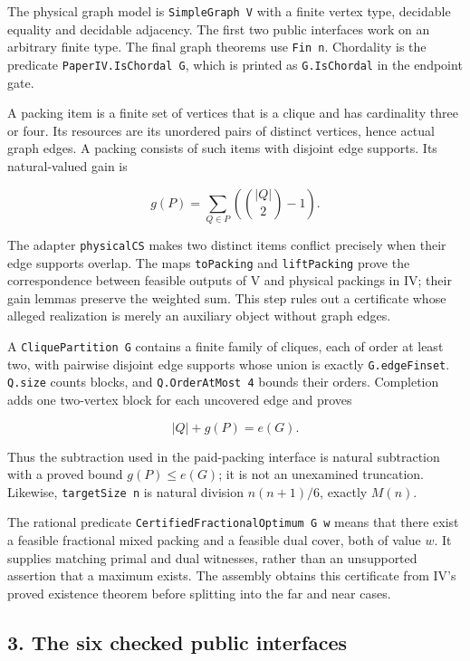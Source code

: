\documentclass[english,11pt,a4paper]{article}
\begin{document}
The physical graph model is \texttt{SimpleGraph\ V} with a finite vertex
type, decidable equality and decidable adjacency. The first two public
interfaces work on an arbitrary finite type. The final graph theorems
use \texttt{Fin\ n}. Chordality is the predicate
\texttt{PaperIV.IsChordal\ G}, which is printed as \nolinkurl{G.IsChordal}
in the endpoint gate.

A packing item is a finite set of vertices that is a clique and has
cardinality three or four. Its resources are its unordered pairs of
distinct vertices, hence actual graph edges. A packing consists of such
items with disjoint edge supports. Its natural-valued gain is

\[
g(P)=\sum_{Q\in P}\left(\binom{|Q|}{2}-1\right).
\]

The adapter \nolinkurl{physicalCS} makes two distinct items conflict
precisely when their edge supports overlap. The maps \nolinkurl{toPacking}
and \nolinkurl{liftPacking} prove the correspondence between feasible
outputs of V and physical packings in IV; their gain lemmas preserve the
weighted sum. This step rules out a certificate whose alleged
realization is merely an auxiliary object without graph edges.

A \texttt{CliquePartition\ G} contains a finite family of cliques, each
of order at least two, with pairwise disjoint edge supports whose union
is exactly \nolinkurl{G.edgeFinset}. \nolinkurl{Q.size} counts blocks, and
\texttt{Q.OrderAtMost\ 4} bounds their orders. Completion adds one
two-vertex block for each uncovered edge and proves

\[
|Q|+g(P)=e(G).
\]

Thus the subtraction used in the paid-packing interface is natural
subtraction with a proved bound \(g(P)\le e(G)\); it is not an
unexamined truncation. Likewise, \texttt{targetSize\ n} is natural
division \(n(n+1)/6\), exactly \(M(n)\).

The rational predicate \texttt{CertifiedFractionalOptimum\ G\ w} means
that there exist a feasible fractional mixed packing and a feasible dual
cover, both of value \(w\). It supplies matching primal and dual
witnesses, rather than an unsupported assertion that a maximum exists.
The assembly obtains this certificate from IV's proved existence theorem
before splitting into the far and near cases.

\subsection{3. The six checked public
interfaces}\label{the-six-checked-public-interfaces}
\end{document}
